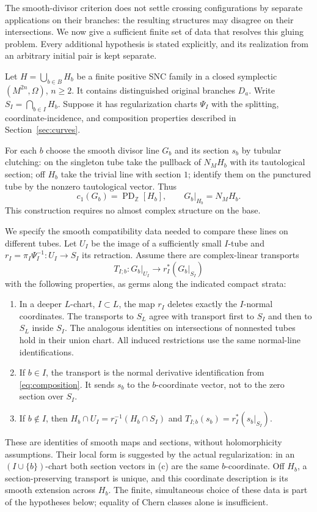 \documentclass[11pt]{article}
\theoremstyle{definition}
\theoremstyle{remark}
\newcommand{\Z}{\mathbb Z}
\newcommand{\PD}{\operatorname{PD}_{\Z}}
\begin{document}
The smooth-divisor criterion does not settle crossing configurations by separate applications on their branches: the resulting structures may disagree on their intersections. We now give a sufficient finite set of data that resolves this gluing problem. Every additional hypothesis is stated explicitly, and its realization from an arbitrary initial pair is kept separate.

Let $H=\bigcup_{b\in B}H_b$ be a finite positive SNC family in a closed symplectic $(M^{2n},\Omega)$, $n\geq2$. It contains distinguished original branches $D_a$. Write $S_I=\bigcap_{b\in I}H_b$. Suppose it has regularization charts $\Psi_I$ with the splitting, coordinate-incidence, and composition properties described in Section~\ref{sec:curves}.

For each $b$ choose the smooth divisor line $G_b$ and its section $s_b$ by tubular clutching: on the singleton tube take the pullback of $N_MH_b$ with its tautological section; off $H_b$ take the trivial line with section $1$; identify them on the punctured tube by the nonzero tautological vector. Thus
\begin{equation}\label{eq:G}
 c_1(G_b)=\PD[H_b],\qquad G_b|_{H_b}=N_MH_b.
\end{equation}
This construction requires no almost complex structure on the base.

We specify the smooth compatibility data needed to compare these lines on different tubes. Let $U_I$ be the image of a sufficiently small $I$-tube and $r_I=\pi_I\Psi_I^{-1}:U_I\to S_I$ its retraction. Assume there are complex-linear transports
\begin{equation}\label{eq:transport}
 T_{I;b}:G_b|_{U_I}\longrightarrow r_I^*(G_b|_{S_I})
\end{equation}
with the following properties, as germs along the indicated compact strata:
\begin{enumerate}[label=(\alph*),leftmargin=*]
\item In a deeper $L$-chart, $I\subset L$, the map $r_I$ deletes exactly the $I$-normal coordinates. The transports to $S_L$ agree with transport first to $S_I$ and then to $S_L$ inside $S_I$. The analogous identities on intersections of nonnested tubes hold in their union chart. All induced restrictions use the same normal-line identifications.
\item If $b\in I$, the transport is the normal derivative identification from \eqref{eq:composition}. It sends $s_b$ to the $b$-coordinate vector, not to the zero section over $S_I$.
\item If $b\notin I$, then $H_b\cap U_I=r_I^{-1}(H_b\cap S_I)$ and $T_{I;b}(s_b)=r_I^*(s_b|_{S_I})$.
\end{enumerate}
These are identities of smooth maps and sections, without holomorphicity assumptions. Their local form is suggested by the actual regularization: in an $(I\cup\{b\})$-chart both section vectors in (c) are the same $b$-coordinate. Off $H_b$, a section-preserving transport is unique, and this coordinate description is its smooth extension across $H_b$. The finite, simultaneous choice of these data is part of the hypotheses below; equality of Chern classes alone is insufficient.
\end{document}
